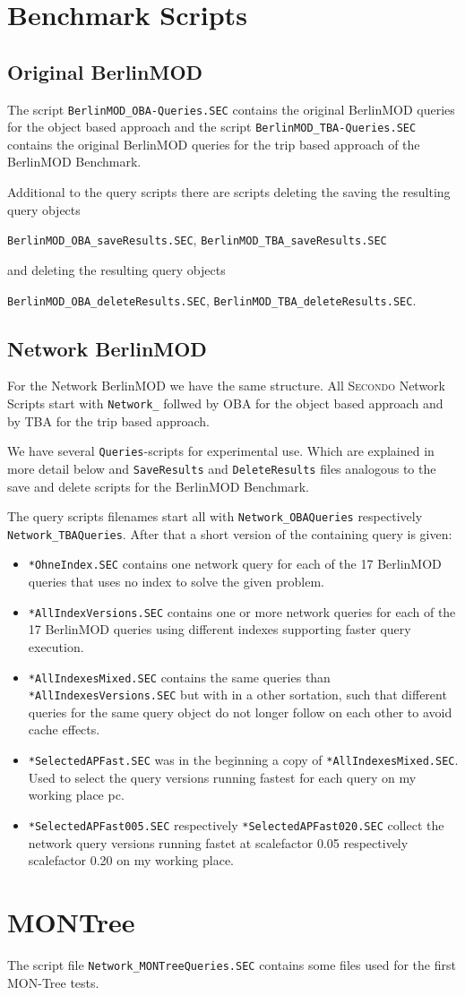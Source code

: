\documentclass[a4paper,10pt]{article}
\newcommand{\secondo}{\textsc{Secondo}}
\newcommand{\file}[1]{\texttt{#1}}
\begin{document}
\section{Benchmark Scripts}
\subsection{Original BerlinMOD}
The script \file{BerlinMOD\_OBA-Queries.SEC} contains the original BerlinMOD queries for the object based approach and the script \file{BerlinMOD\_TBA-Queries.SEC} contains the original BerlinMOD queries for the trip based approach of the BerlinMOD Benchmark.

Additional to the query scripts there are scripts deleting the saving the resulting query objects
 
\file{BerlinMOD\_OBA\_saveResults.SEC}, \file{BerlinMOD\_TBA\_saveResults.SEC} 

and deleting the resulting query objects 

\file{BerlinMOD\_OBA\_deleteResults.SEC}, \file{BerlinMOD\_TBA\_deleteResults.SEC}.


\subsection{Network BerlinMOD}
For the Network BerlinMOD we have the same structure. All \secondo{} Network Scripts start with \file{Network\_} follwed by OBA for the object based approach and by TBA for the trip based approach.

We have several \file{Queries}-scripts for experimental use. Which are explained in more detail below and \file{SaveResults} and \file{DeleteResults} files analogous to the save and delete scripts for the BerlinMOD Benchmark.

The query scripts filenames start all with \file{Network\_OBAQueries} respectively \file{Network\_TBAQueries}. After that a short version of the containing query is given:

\begin{itemize}
  \item \file{*OhneIndex.SEC} contains one network query for each of the 17 BerlinMOD queries that uses no index to solve the given problem.
  \item \file{*AllIndexVersions.SEC} contains one or more network queries for each of the 17 BerlinMOD queries using different indexes supporting faster query execution.
  \item \file{*AllIndexesMixed.SEC}  contains the same queries than \file{*AllIndexesVersions.SEC} but with in a other sortation, such that different queries for the same query object do not longer follow on each other to avoid cache effects.
  \item \file{*SelectedAPFast.SEC} was in the beginning a copy of \file{*AllIndexesMixed.SEC}. Used to select the query versions running fastest for each query on my working place pc.
  \item \file{*SelectedAPFast005.SEC} respectively \file{*SelectedAPFast020.SEC} collect the network query versions running fastet at scalefactor 0.05 respectively scalefactor 0.20 on my working place. 
\end{itemize}

\section{MONTree}
The script file \file{Network\_MONTreeQueries.SEC} contains some files used for the first MON-Tree tests.
\end{document}
